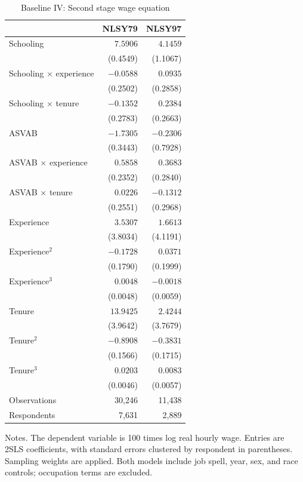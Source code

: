 \begin{table}[p]\centering
\caption{Baseline IV: Second stage wage equation}\label{tab:baseline_iv_secondstage}
\begin{threeparttable}\small
\begin{tabular*}{\textwidth}{@{\extracolsep{\fill}}lrr@{}}
\toprule
& NLSY79 & NLSY97 \\
\midrule
Schooling & $7.5906$ & $4.1459$ \\
 & (0.4549) & (1.1067) \\
Schooling $\times$ experience & $-0.0588$ & $0.0935$ \\
 & (0.2502) & (0.2858) \\
Schooling $\times$ tenure & $-0.1352$ & $0.2384$ \\
 & (0.2783) & (0.2663) \\
\addlinespace[3pt]
ASVAB & $-1.7305$ & $-0.2306$ \\
 & (0.3443) & (0.7928) \\
ASVAB $\times$ experience & $0.5858$ & $0.3683$ \\
 & (0.2352) & (0.2840) \\
ASVAB $\times$ tenure & $0.0226$ & $-0.1312$ \\
 & (0.2551) & (0.2968) \\
\addlinespace[3pt]
Experience & $3.5307$ & $1.6613$ \\
 & (3.8034) & (4.1191) \\
Experience$^2$ & $-0.1728$ & $0.0371$ \\
 & (0.1790) & (0.1999) \\
Experience$^3$ & $0.0048$ & $-0.0018$ \\
 & (0.0048) & (0.0059) \\
\addlinespace[3pt]
Tenure & $13.9425$ & $2.4244$ \\
 & (3.9642) & (3.7679) \\
Tenure$^2$ & $-0.8908$ & $-0.3831$ \\
 & (0.1566) & (0.1715) \\
Tenure$^3$ & $0.0203$ & $0.0083$ \\
 & (0.0046) & (0.0057) \\
\midrule
Observations & 30,246 & 11,438 \\
Respondents & 7,631 & 2,889 \\
\bottomrule\end{tabular*}
\begin{tablenotes}[flushleft]\footnotesize
\item Notes. The dependent variable is 100 times log real hourly wage. Entries are 2SLS coefficients, with standard errors clustered by respondent in parentheses. Sampling weights are applied. Both models include job spell, year, sex, and race controls; occupation terms are excluded.

\end{tablenotes}
\end{threeparttable}
\end{table}
